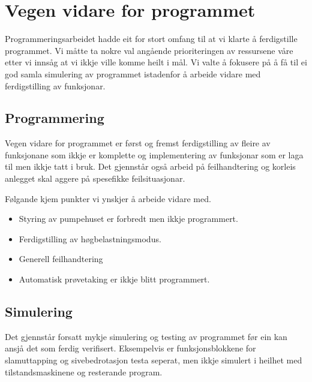 \section{Vegen vidare for programmet}
\thispagestyle{fancy}

Programmeringsarbeidet hadde eit for stort omfang til at vi klarte å ferdigstille programmet. 
Vi måtte ta nokre val angående prioriteringen av ressursene våre etter vi innsåg at vi ikkje ville komme heilt i mål.
Vi valte å fokusere på å få til ei god samla simulering av programmet istadenfor å arbeide vidare med ferdigstilling av funksjonar.

\subsection{Programmering}

Vegen vidare for programmet er først og fremst ferdigstilling av fleire av funksjonane som ikkje er komplette og 
implementering av funksjonar som er laga til men ikkje tatt i bruk. 
Det gjennstår også arbeid på feilhandtering og korleis anlegget skal aggere på spesefikke feilsituasjonar.

Følgande kjem punkter vi ynskjer å arbeide vidare med.

\begin{itemize}
    \item Styring av pumpehuset er forbredt men ikkje programmert. 
    \item Ferdigstilling av høgbelastningsmodus.
    \item Generell feilhandtering
    \item Automatisk prøvetaking er ikkje blitt programmert.
\end{itemize}


\subsection{Simulering}

Det gjennstår forsatt mykje simulering og testing av programmet før ein kan ansjå det som ferdig verifisert.
Eksempelvis er funksjonsblokkene for slamuttapping og sivebedrotasjon testa seperat, men ikkje simulert i heilhet med
tilstandsmaskinene og resterande program.

